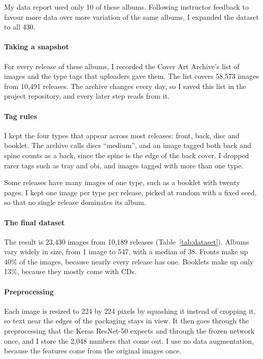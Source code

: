 \documentclass[conference]{IEEEtran}
\begin{document}
My data report used only 10 of these albums. Following instructor feedback to favour more data over more variation of the same albums, I expanded the dataset to all 430.

\paragraph{Taking a snapshot} For every release of these albums, I recorded the Cover Art Archive's list of images and the type tags that uploaders gave them. The list covers 58,573 images from 10,491 releases. The archive changes every day, so I saved this list in the project repository, and every later step reads from it.

\paragraph{Tag rules} I kept the four types that appear across most releases: front, back, disc and booklet. The archive calls discs ``medium'', and an image tagged both back and spine counts as a back, since the spine is the edge of the back cover. I dropped rarer tags such as tray and obi, and images tagged with more than one type.

Some releases have many images of one type, such as a booklet with twenty pages. I kept one image per type per release, picked at random with a fixed seed, so that no single release dominates its album.

\paragraph{The final dataset} The result is 23,430 images from 10,189 releases (Table~\ref{tab:dataset}). Albums vary widely in size, from 1 image to 547, with a median of 38. Fronts make up 40\% of the images, because nearly every release has one. Booklets make up only 13\%, because they mostly come with CDs.

\paragraph{Preprocessing} Each image is resized to 224 by 224 pixels by squashing it instead of cropping it, so text near the edges of the packaging stays in view. It then goes through the preprocessing that the Keras ResNet-50 expects and through the frozen network once, and I store the 2,048 numbers that come out. I use no data augmentation, because the features come from the original images once.
\end{document}
